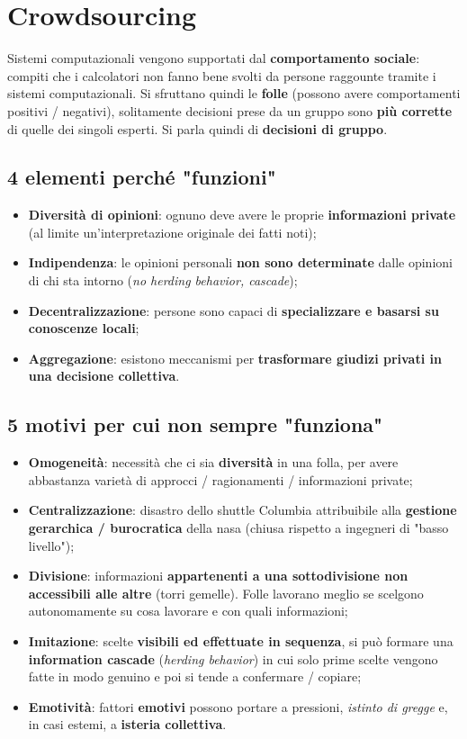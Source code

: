\documentclass{article}
\begin{document}
\section{Crowdsourcing}
  Sistemi computazionali vengono supportati dal \textbf{comportamento sociale}: compiti che i calcolatori non fanno bene svolti da persone raggounte tramite i sistemi computazionali. Si sfruttano quindi le \textbf{folle} (possono avere comportamenti positivi / negativi), solitamente decisioni prese da un gruppo sono \textbf{più corrette} di quelle dei singoli esperti. Si parla quindi di \textbf{decisioni di gruppo}.
  \subsection{4 elementi perché "funzioni"}
    \begin{itemize}
        \item \textbf{Diversità di opinioni}: ognuno deve avere le proprie \textbf{informazioni private} (al limite un'interpretazione originale dei fatti noti);
        \item \textbf{Indipendenza}: le opinioni personali \textbf{non sono determinate} dalle opinioni di chi sta intorno (\textit{no herding behavior, cascade});
        \item \textbf{Decentralizzazione}: persone sono capaci di \textbf{specializzare e basarsi su conoscenze locali};
        \item \textbf{Aggregazione}: esistono meccanismi per \textbf{trasformare giudizi privati in una decisione collettiva}.
    \end{itemize}
  \subsection{5 motivi per cui non sempre "funziona"}
    \begin{itemize}
        \item \textbf{Omogeneità}: necessità che ci sia \textbf{diversità} in una folla, per avere abbastanza varietà di approcci / ragionamenti / informazioni private;
        \item \textbf{Centralizzazione}: disastro dello shuttle Columbia attribuibile alla \textbf{gestione gerarchica / burocratica} della nasa (chiusa rispetto a ingegneri di "basso livello");
        \item \textbf{Divisione}: informazioni \textbf{appartenenti a una sottodivisione non accessibili alle altre} (torri gemelle). Folle lavorano meglio se scelgono autonomamente su cosa lavorare e con quali informazioni;
        \item \textbf{Imitazione}: scelte \textbf{visibili ed effettuate in sequenza}, si può formare una \textbf{information cascade} (\textit{herding behavior}) in cui solo prime scelte vengono fatte in modo genuino e poi si tende a confermare / copiare;
        \item \textbf{Emotività}: fattori \textbf{emotivi} possono portare a pressioni, \textit{istinto di gregge} e, in casi estemi, a \textbf{isteria collettiva}.
    \end{itemize}
\end{document}
